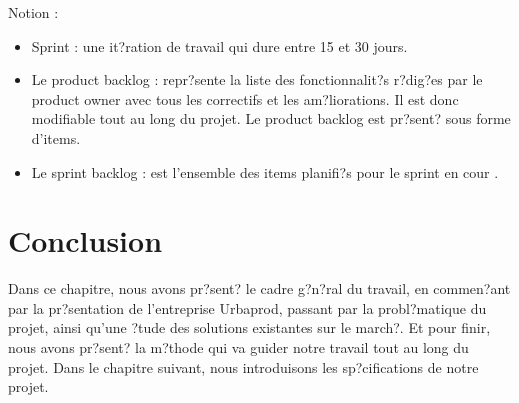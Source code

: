 \begin{spacing}{1.5}
Notion :
\begin{itemize}
  \item Sprint  : une it?ration de travail qui dure entre 15 et 30 jours.
  \item Le product backlog : repr?sente la liste des fonctionnalit?s r?dig?es par le product owner avec tous les correctifs et les am?liorations. Il est donc modifiable tout au long du projet. Le product backlog est pr?sent? sous forme d'items.
  \item Le sprint backlog : est l'ensemble des items planifi?s pour le sprint en cour \cite{SCRUM}.
\end{itemize}


\section*{Conclusion}
Dans ce chapitre, nous avons pr?sent? le cadre g?n?ral du travail, en commen?ant par la pr?sentation de l'entreprise Urbaprod, passant par la probl?matique du projet, ainsi qu'une ?tude des solutions existantes sur le march?. Et pour finir, nous avons pr?sent? la m?thode qui va guider notre travail tout au long du projet. Dans le chapitre suivant, nous introduisons les sp?cifications de notre projet.


\end{spacing}
